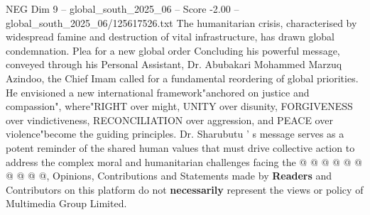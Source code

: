 \begin{textsample}{NEG Dim 9 – global\_south\_2025\_06 – Score -2.00 – global\_south\_2025\_06/125617526.txt}
The humanitarian crisis, characterised by widespread famine and destruction of vital infrastructure, has drawn global condemnation.
Plea for a new global order Concluding his powerful message, conveyed through his Personal Assistant, Dr.
Abubakari Mohammed Marzuq Azindoo, the Chief Imam called for a fundamental reordering of global priorities.
He envisioned a new international framework"anchored on justice and compassion", where"RIGHT over might, UNITY over disunity, FORGIVENESS over vindictiveness, RECONCILIATION over aggression, and PEACE over violence"become the guiding principles.
Dr.
Sharubutu ' s message serves as a potent reminder of the shared human values that must drive collective action to address the complex moral and humanitarian challenges facing the @ @ @ @ @ @ @ @ @ @, Opinions, Contributions and Statements made by \textbf{Readers} and Contributors on this platform do not \textbf{necessarily} represent the views or policy of Multimedia Group Limited.

\end{textsample}
